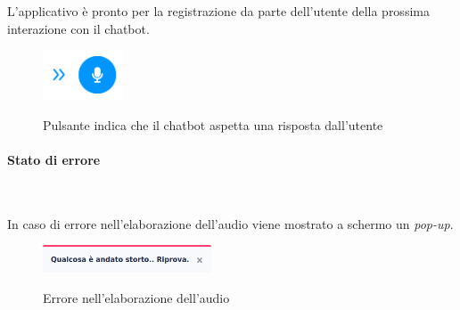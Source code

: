 	\noindent L'applicativo è pronto per la registrazione da parte dell'utente della prossima interazione con il \gls{chatbot}. 
	
	\begin{figure}[H]
		\centering
		\includegraphics[width=2.4cm]{immagini/risposta.png} \\
		\caption{\label{fig:risposta} Pulsante indica che il chatbot aspetta una risposta dall'utente}
	\end{figure}
	
	\paragraph{Stato di errore} ~\smallskip 
	
	\noindent In caso di errore nell'elaborazione dell'audio viene mostrato a schermo un \emph{pop-up}.
	
		\begin{figure}[H]
			\centering
			\includegraphics[width=5cm]{immagini/errore_reg.png} \\
			\caption{\label{fig:errore-reg} Errore nell'elaborazione dell'audio}
		\end{figure}
	
